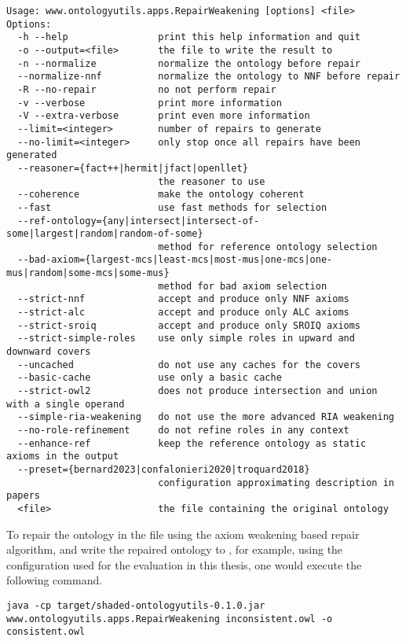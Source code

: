 \begin{lstlisting}
Usage: www.ontologyutils.apps.RepairWeakening [options] <file>
Options:
  -h --help                print this help information and quit
  -o --output=<file>       the file to write the result to
  -n --normalize           normalize the ontology before repair
  --normalize-nnf          normalize the ontology to NNF before repair
  -R --no-repair           no not perform repair
  -v --verbose             print more information
  -V --extra-verbose       print even more information
  --limit=<integer>        number of repairs to generate
  --no-limit=<integer>     only stop once all repairs have been generated
  --reasoner={fact++|hermit|jfact|openllet}
                           the reasoner to use
  --coherence              make the ontology coherent
  --fast                   use fast methods for selection
  --ref-ontology={any|intersect|intersect-of-some|largest|random|random-of-some}
                           method for reference ontology selection
  --bad-axiom={largest-mcs|least-mcs|most-mus|one-mcs|one-mus|random|some-mcs|some-mus}
                           method for bad axiom selection
  --strict-nnf             accept and produce only NNF axioms
  --strict-alc             accept and produce only ALC axioms
  --strict-sroiq           accept and produce only SROIQ axioms
  --strict-simple-roles    use only simple roles in upward and downward covers
  --uncached               do not use any caches for the covers
  --basic-cache            use only a basic cache
  --strict-owl2            does not produce intersection and union with a single operand
  --simple-ria-weakening   do not use the more advanced RIA weakening
  --no-role-refinement     do not refine roles in any context
  --enhance-ref            keep the reference ontology as static axioms in the output
  --preset={bernard2023|confalonieri2020|troquard2018}
                           configuration approximating description in papers
  <file>                   the file containing the original ontology
\end{lstlisting}

To repair the ontology in the file  using the axiom weakening based repair algorithm, and write the repaired ontology to , for example, using the configuration used for the evaluation in this thesis, one would execute the following command.

\begin{lstlisting}
java -cp target/shaded-ontologyutils-0.1.0.jar www.ontologyutils.apps.RepairWeakening inconsistent.owl -o consistent.owl
\end{lstlisting}
